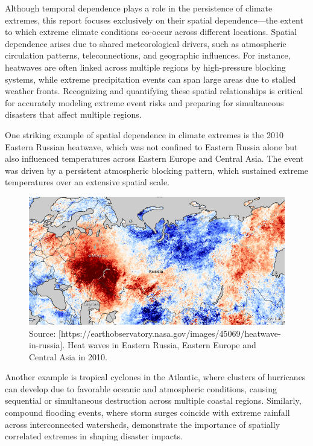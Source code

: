 \documentclass[
]{krantz}
\begin{document}
Although temporal dependence plays a role in the persistence of climate extremes, this report focuses exclusively on their spatial dependence---the extent to which extreme climate conditions co-occur across different locations. Spatial dependence arises due to shared meteorological drivers, such as atmospheric circulation patterns, teleconnections, and geographic influences. For instance, heatwaves are often linked across multiple regions by high-pressure blocking systems, while extreme precipitation events can span large areas due to stalled weather fronts. Recognizing and quantifying these spatial relationships is critical for accurately modeling extreme event risks and preparing for simultaneous disasters that affect multiple regions.

One striking example of spatial dependence in climate extremes is the 2010 Eastern Russian heatwave, which was not confined to Eastern Russia alone but also influenced temperatures across Eastern Europe and Central Asia. The event was driven by a persistent atmospheric blocking pattern, which sustained extreme temperatures over an extensive spatial scale.

\vspace{1em}
\begin{figure}

{\centering \includegraphics[width=0.8\linewidth]{work/06-anthropo/figures/russialsta_heatwave_2010208} 

}

\caption{Source: [https://earthobservatory.nasa.gov/images/45069/heatwave-in-russia]. Heat waves in Eastern Russia, Eastern Europe and Central Asia in 2010.}\label{fig:unnamed-chunk-4}
\end{figure}
\vspace{1em}

Another example is tropical cyclones in the Atlantic, where clusters of hurricanes can develop due to favorable oceanic and atmospheric conditions, causing sequential or simultaneous destruction across multiple coastal regions. Similarly, compound flooding events, where storm surges coincide with extreme rainfall across interconnected watersheds, demonstrate the importance of spatially correlated extremes in shaping disaster impacts.
\end{document}

